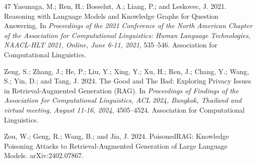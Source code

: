 \documentclass[letterpaper]{article} %
\begin{document}
\begin{thebibliography}{47}
    Yasunaga, M.; Ren, H.; Bosselut, A.; Liang, P.; and Leskovec, J. 2021.
     Reasoning with Language Models and Knowledge Graphs for Question Answering.
    \newblock In \emph{Proceedings of the 2021 Conference of the North American Chapter of the Association for Computational Linguistics: Human Language Technologies, {NAACL-HLT} 2021, Online, June 6-11, 2021}, 535--546. Association for Computational Linguistics.
    
    Zeng, S.; Zhang, J.; He, P.; Liu, Y.; Xing, Y.; Xu, H.; Ren, J.; Chang, Y.; Wang, S.; Yin, D.; and Tang, J. 2024.
    \newblock The Good and The Bad: Exploring Privacy Issues in Retrieval-Augmented Generation {(RAG)}.
    \newblock In \emph{Proceedings of Findings of the Association for Computational Linguistics, {ACL} 2024, Bangkok, Thailand and virtual meeting, August 11-16, 2024}, 4505--4524. Association for Computational Linguistics.
    
    Zou, W.; Geng, R.; Wang, B.; and Jia, J. 2024.
    \newblock PoisonedRAG: Knowledge Poisoning Attacks to Retrieval-Augmented Generation of Large Language Models.
    \newblock arXiv:2402.07867.
    
    \end{thebibliography}
    
\end{document}
